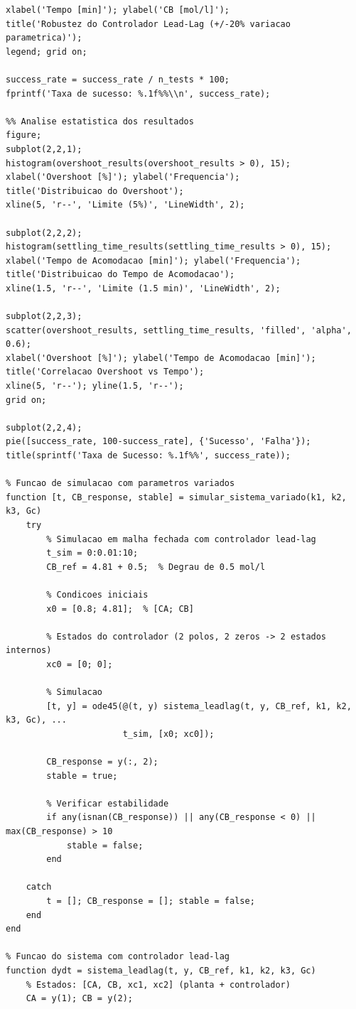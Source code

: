 \documentclass[a4paper,12pt]{article}
\begin{document}
\begin{lstlisting}[caption=Simulacao de robustez - Controlador Lead-Lag]
xlabel('Tempo [min]'); ylabel('CB [mol/l]');
title('Robustez do Controlador Lead-Lag (+/-20% variacao parametrica)');
legend; grid on;

success_rate = success_rate / n_tests * 100;
fprintf('Taxa de sucesso: %.1f%%\\n', success_rate);

%% Analise estatistica dos resultados
figure;
subplot(2,2,1);
histogram(overshoot_results(overshoot_results > 0), 15);
xlabel('Overshoot [%]'); ylabel('Frequencia');
title('Distribuicao do Overshoot');
xline(5, 'r--', 'Limite (5%)', 'LineWidth', 2);

subplot(2,2,2);
histogram(settling_time_results(settling_time_results > 0), 15);
xlabel('Tempo de Acomodacao [min]'); ylabel('Frequencia');
title('Distribuicao do Tempo de Acomodacao');
xline(1.5, 'r--', 'Limite (1.5 min)', 'LineWidth', 2);

subplot(2,2,3);
scatter(overshoot_results, settling_time_results, 'filled', 'alpha', 0.6);
xlabel('Overshoot [%]'); ylabel('Tempo de Acomodacao [min]');
title('Correlacao Overshoot vs Tempo');
xline(5, 'r--'); yline(1.5, 'r--');
grid on;

subplot(2,2,4);
pie([success_rate, 100-success_rate], {'Sucesso', 'Falha'});
title(sprintf('Taxa de Sucesso: %.1f%%', success_rate));

% Funcao de simulacao com parametros variados
function [t, CB_response, stable] = simular_sistema_variado(k1, k2, k3, Gc)
    try
        % Simulacao em malha fechada com controlador lead-lag
        t_sim = 0:0.01:10;
        CB_ref = 4.81 + 0.5;  % Degrau de 0.5 mol/l
        
        % Condicoes iniciais
        x0 = [0.8; 4.81];  % [CA; CB]
        
        % Estados do controlador (2 polos, 2 zeros -> 2 estados internos)
        xc0 = [0; 0];
        
        % Simulacao
        [t, y] = ode45(@(t, y) sistema_leadlag(t, y, CB_ref, k1, k2, k3, Gc), ...
                       t_sim, [x0; xc0]);
        
        CB_response = y(:, 2);
        stable = true;
        
        % Verificar estabilidade
        if any(isnan(CB_response)) || any(CB_response < 0) || max(CB_response) > 10
            stable = false;
        end
        
    catch
        t = []; CB_response = []; stable = false;
    end
end

% Funcao do sistema com controlador lead-lag
function dydt = sistema_leadlag(t, y, CB_ref, k1, k2, k3, Gc)
    % Estados: [CA, CB, xc1, xc2] (planta + controlador)
    CA = y(1); CB = y(2);
    

\end{lstlisting}
\end{document}
